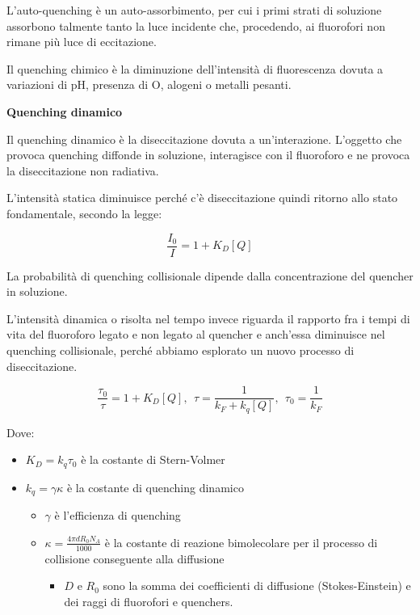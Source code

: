 L'auto-quenching è un auto-assorbimento, per cui i primi strati di
soluzione assorbono talmente tanto la luce incidente che, procedendo, ai
fluorofori non rimane più luce di eccitazione.

Il quenching chimico è la diminuzione dell'intensità di fluorescenza
dovuta a variazioni di pH, presenza di O, alogeni o metalli pesanti.

\textbf{Quenching dinamico}

Il quenching dinamico è la diseccitazione dovuta a un'interazione.
L'oggetto che provoca quenching diffonde in soluzione, interagisce con
il fluoroforo e ne provoca la diseccitazione non radiativa.

L'intensità statica diminuisce perché c'è diseccitazione quindi ritorno
allo stato fondamentale, secondo la legge:

\[\frac{I_{0}}{I} = 1 + K_{D}\left\lbrack Q \right\rbrack\]

La probabilità di quenching collisionale dipende dalla concentrazione
del quencher in soluzione.

L'intensità dinamica o risolta nel tempo invece riguarda il rapporto fra
i tempi di vita del fluoroforo legato e non legato al quencher e
anch'essa diminuisce nel quenching collisionale, perché abbiamo
esplorato un nuovo processo di diseccitazione.

\[\frac{\tau_{0}}{\tau} = 1 + K_{D}\left\lbrack Q \right\rbrack,\ \ \tau = \frac{1}{k_{F} + k_{q}\left\lbrack Q \right\rbrack},\ \ \tau_{0} = \frac{1}{k_{F}}\]

Dove:

\begin{itemize}
\item
  \(K_{D} = k_{q}\tau_{0}\) è la costante di Stern-Volmer
\item
  \(k_{q} = \gamma\kappa\) è la costante di quenching dinamico

  \begin{itemize}
  \item
    \(\gamma\) è l'efficienza di quenching
  \item
    \(\kappa = \frac{4\pi dR_{0}N_{A}}{1000}\) è la costante di reazione
    bimolecolare per il processo di collisione conseguente alla
    diffusione

    \begin{itemize}
    \item
      \(D\) e \(R_{0}\) sono la somma dei coefficienti di diffusione
      (Stokes-Einstein) e dei raggi di fluorofori e quenchers.
    \end{itemize}
  \end{itemize}
\end{itemize}


